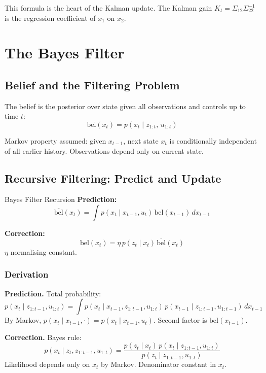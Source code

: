 \documentclass[11pt,a4paper]{article}
\begin{document}
This formula is the heart of the Kalman update. The Kalman gain $K_t = \Sigma_{12}\Sigma_{22}^{-1}$ is the regression coefficient of $x_1$ on $x_2$.

\section{The Bayes Filter}

\subsection{Belief and the Filtering Problem}

The belief is the posterior over state given all observations and controls up to time $t$:
\begin{equation}
\mathrm{bel}(x_t) = p(x_t \mid z_{1:t},\, u_{1:t})
\end{equation}

Markov property assumed: given $x_{t-1}$, next state $x_t$ is conditionally independent of all earlier history. Observations depend only on current state.

\subsection{Recursive Filtering: Predict and Update}

\begin{algobox}{Bayes Filter Recursion}
\textbf{Prediction:}
\[
\overline{\mathrm{bel}}(x_t) = \int p(x_t \mid x_{t-1}, u_t)\, \mathrm{bel}(x_{t-1})\, dx_{t-1}
\]

\textbf{Correction:}
\[
\mathrm{bel}(x_t) = \eta\, p(z_t \mid x_t)\, \overline{\mathrm{bel}}(x_t)
\]
$\eta$ normalising constant.
\end{algobox}

\subsubsection{Derivation}

\textbf{Prediction.} Total probability:
\[
p(x_t \mid z_{1:t-1}, u_{1:t}) = \int p(x_t \mid x_{t-1}, z_{1:t-1}, u_{1:t})\, p(x_{t-1} \mid z_{1:t-1}, u_{1:t-1})\, dx_{t-1}
\]
By Markov, $p(x_t \mid x_{t-1}, \cdot) = p(x_t \mid x_{t-1}, u_t)$. Second factor is $\mathrm{bel}(x_{t-1})$.

\textbf{Correction.} Bayes rule:
\[
p(x_t \mid z_t, z_{1:t-1}, u_{1:t}) = \frac{p(z_t \mid x_t)\, p(x_t \mid z_{1:t-1}, u_{1:t})}{p(z_t \mid z_{1:t-1}, u_{1:t})}
\]
Likelihood depends only on $x_t$ by Markov. Denominator constant in $x_t$.
\end{document}
